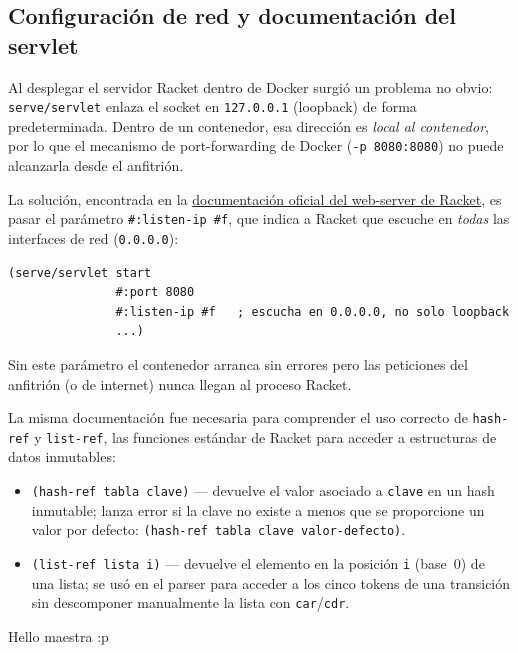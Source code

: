 \documentclass{article}
\begin{document}
\subsection{Configuración de red y documentación del servlet}

Al desplegar el servidor Racket dentro de Docker surgió un problema no obvio:
\texttt{serve/servlet} enlaza el socket en \texttt{127.0.0.1} (loopback)
de forma predeterminada.
Dentro de un contenedor, esa dirección es \emph{local al contenedor},
por lo que el mecanismo de port-forwarding de Docker
(\texttt{-p 8080:8080}) no puede alcanzarla desde el anfitrión.

La solución, encontrada en la
\href{https://docs.racket-lang.org/web-server}{documentación oficial del web-server de Racket},
es pasar el parámetro \texttt{\#:listen-ip \#f}, que indica a Racket que escuche
en \emph{todas} las interfaces de red (\texttt{0.0.0.0}):

\begin{verbatim}
(serve/servlet start
               #:port 8080
               #:listen-ip #f   ; escucha en 0.0.0.0, no solo loopback
               ...)
\end{verbatim}

Sin este parámetro el contenedor arranca sin errores pero las peticiones del
anfitrión (o de internet) nunca llegan al proceso Racket.

La misma documentación fue necesaria para comprender el uso correcto de
\texttt{hash-ref} y \texttt{list-ref}, las funciones estándar de Racket para
acceder a estructuras de datos inmutables:

\begin{itemize}
  \item \texttt{(hash-ref tabla clave)} — devuelve el valor asociado a \texttt{clave}
        en un hash inmutable; lanza error si la clave no existe a menos que se
        proporcione un valor por defecto: \texttt{(hash-ref tabla clave valor-defecto)}.
  \item \texttt{(list-ref lista i)} — devuelve el elemento en la posición \texttt{i}
        (base~0) de una lista; se usó en el parser para acceder a los cinco tokens
        de una transición sin descomponer manualmente la lista con \texttt{car}/\texttt{cdr}.
\end{itemize}

\medskip

\printbibliography

\tiny{Hello maestra :p}
\end{document}

